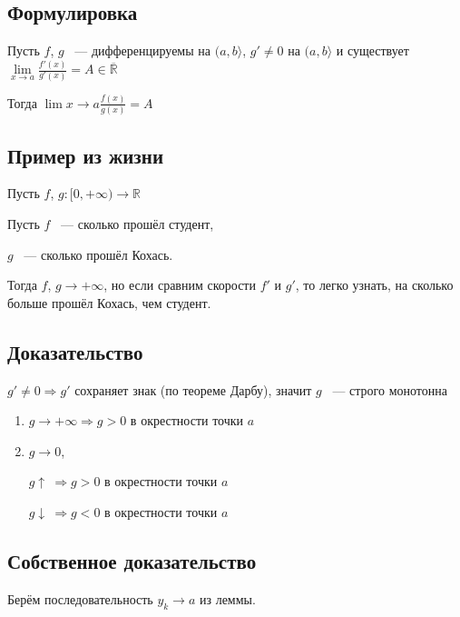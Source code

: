 \documentclass{article}
\begin{document}
		\subsection{Формулировка}
			
			Пусть $f$, $g$ ~--- дифференцируемы на $(a, b \rangle$, $g' \neq 0$ на $(a, b \rangle$ и существует $\lim\limits_{x \rightarrow a} \frac{f'(x)}{g'(x)} = A \in \overline{\mathbb{R}}$
			
			Тогда $\lim\limits{x \rightarrow a} \frac{f(x)}{g(x)} = A$
			
		\subsection{Пример из жизни}
		
			Пусть $f$, $g : [0, +\infty) \rightarrow \mathbb{R}$
			
			Пусть $f$ ~--- сколько прошёл студент, 	
			
				$g$ ~--- сколько прошёл Кохась.
				
			Тогда $f$, $g \rightarrow +\infty$, но если сравним скорости $f'$ и $g'$, то легко узнать, на сколько больше прошёл Кохась, чем студент.
			
		\subsection{Доказательство}
		
			$g' \neq 0 \Rightarrow g'$ сохраняет знак (по теореме Дарбу), значит $g$ ~--- строго монотонна
			
			\begin{enumerate}
			
				\item $g \rightarrow +\infty \Rightarrow g > 0$ в окрестности точки $a$
				
				\item $g \rightarrow 0$,
					
					$g \uparrow \ \Rightarrow g > 0$ в окрестности точки $a$
			
					$g \downarrow \ \Rightarrow g < 0$ в окрестности точки $a$
					
			\end{enumerate}
			
		\subsection{Собственное доказательство}
		
			Берём последовательность $y_k \rightarrow a$ из леммы.
			
\end{document}
